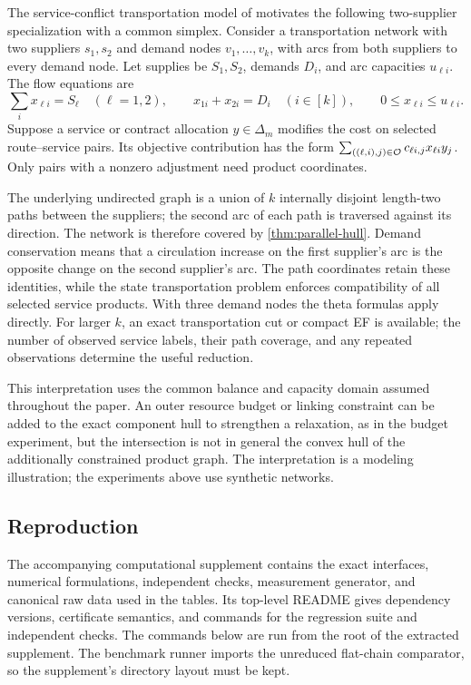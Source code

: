 The service-conflict transportation model of
\citet[Section~4.2]{KhademniaDavarnia2025} motivates the following
two-supplier specialization with a common simplex.
Consider a transportation network with two suppliers
$s_1,s_2$ and demand nodes $v_1,\ldots,v_k$, with arcs from both suppliers
to every demand node. Let supplies be $S_1,S_2$, demands $D_i$, and
arc capacities $u_{\ell i}$. The flow equations are
\[
 \sum_i x_{\ell i}=S_\ell\quad(\ell=1,2),\qquad
 x_{1i}+x_{2i}=D_i\quad(i\in[k]),\qquad
 0\le x_{\ell i}\le u_{\ell i}.
\]
Suppose a service or contract allocation $y\in\Delta_m$ modifies the
cost on selected route--service pairs. Its objective contribution has the
form $\sum_{((\ell,i),j)\in\mathcal O}c_{\ell i,j}x_{\ell i}y_j$.
Only pairs with a nonzero adjustment need product coordinates.

The underlying undirected graph is a union of $k$ internally disjoint
length-two paths between the suppliers; the second arc of each path is
traversed against its direction. The network is therefore covered by
\cref{thm:parallel-hull}. Demand conservation means that a circulation
increase on the first supplier's arc is the opposite change on the second
supplier's arc. The path coordinates retain these identities, while the
state transportation problem enforces compatibility of all selected service
products. With three demand nodes the theta formulas apply directly.
For larger $k$, an exact transportation cut or compact EF is available;
the number of observed service labels, their path coverage, and any repeated
observations determine the useful reduction.

This interpretation uses the common balance and capacity domain assumed
throughout the paper. An outer resource budget or linking constraint can be
added to the exact component hull to strengthen a relaxation, as in the
budget experiment, but the intersection is not in general the convex hull
of the additionally constrained product graph. The interpretation is a
modeling illustration; the experiments above use synthetic networks.

\subsection{Reproduction}

The accompanying computational supplement contains the exact interfaces,
numerical formulations, independent checks, measurement generator, and
canonical raw data used in the tables. Its top-level README gives dependency
versions, certificate semantics, and commands for the regression suite and
independent checks. The commands below are run from the root of the
extracted supplement. The benchmark runner imports the unreduced flat-chain
comparator, so the supplement's directory layout must be kept.

